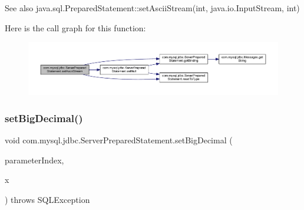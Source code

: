\begin{DoxySeeAlso}{See also}
java.\+sql.\+Prepared\+Statement\+::set\+Ascii\+Stream(int, java.\+io.\+Input\+Stream, int) 
\end{DoxySeeAlso}
Here is the call graph for this function\+:
\nopagebreak
\begin{figure}[H]
\begin{center}
\leavevmode
\includegraphics[width=350pt]{classcom_1_1mysql_1_1jdbc_1_1_server_prepared_statement_a4f9bda77a0fd70b7bfe3b6ff71aab74d_cgraph}
\end{center}
\end{figure}
\mbox{\label{classcom_1_1mysql_1_1jdbc_1_1_server_prepared_statement_a4ebc09b4d7c11864da98aaa889cdaa93}} 
\subsubsection{\texorpdfstring{set\+Big\+Decimal()}{setBigDecimal()}}
{\footnotesize\ttfamily void com.\+mysql.\+jdbc.\+Server\+Prepared\+Statement.\+set\+Big\+Decimal (\begin{DoxyParamCaption}\item[{int}]{parameter\+Index,  }\item[{Big\+Decimal}]{x }\end{DoxyParamCaption}) throws S\+Q\+L\+Exception}

